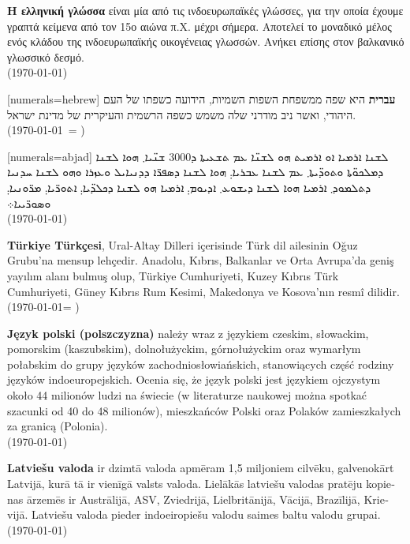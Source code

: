 \documentclass[a4paper]{article}
\begin{document}
\begin{greek}
\textbf{Η ελληνική γλώσσα} είναι μία από τις ινδοευρωπαϊκές γλώσσες, για την
οποία έχουμε γραπτά κείμενα από τον 15ο αιώνα π.Χ. μέχρι σήμερα. Αποτελεί το
μοναδικό μέλος ενός κλάδου της ινδοευρωπαϊκής οικογένειας γλωσσών. Ανήκει
επίσης στον βαλκανικό γλωσσικό δεσμό.\\	
(\today) 
\end{greek}


\begin{hebrew}[numerals=hebrew]
\textbf{עברית} היא שפה ממשפחת השפות השמיות, הידועה כשפתו של העם היהודי, ואשר ניב מודרני שלה משמש כשפה הרשמית והעיקרית של מדינת ישראל. \\
(\today\ = \hebrewtoday)
\end{hebrew}

\begin{syriac}[numerals=abjad]
ܠܫܢܐ ܐܪܡܝܐ ܐܘ ܐܪܡܝܬ ܗܘ ܠܫܢ̈ܐ ܥܡ ܬܫܥܝܬܐ ܕ\textrm{3000} ܫܢ̈ܝܐ܂ ܗܘܐ ܠܫܢܐ ܕܡܠܟܘ̈ܬܐ ܘܬܘܕ̈ܝܬܐ܂ ܥܡ ܠܫܢܐ ܥܒܪܝܐ܄ ܗܘܐ ܠܫܢܐ ܕܣܦܪ̈ܐ ܕܕܢܝܐܝܠ ܘܥܙܪܐ ܘܗܘ ܠܫܢܐ ܚܕܢܝܐ ܕܬܠܡܘܕ܂ ܐܪܡܝܐ ܗܘܐ ܠܫܢܐ ܕܝܫܘܥ܂ ܐܕܝܘܡ܄ ܐܪܡܝܐ ܗܘ ܠܫܢܐ ܕܟܠܕ̈ܝܐ܄ ܐܬܘܪ̈ܝܐ܄ ܡܪ̈ܘܢܝܐ܄ ܘܣܘܪ̈ܝܝܐ܀ \\
(\today)
\end{syriac}

\begin{turkish}
\textbf{Türkiye Türkçesi}, Ural-Altay Dilleri içerisinde Türk dil ailesinin Oğuz Grubu'na mensup lehçedir. Anadolu, Kıbrıs, Balkanlar ve Orta Avrupa'da geniş yayılım alanı bulmuş olup, Türkiye Cumhuriyeti, Kuzey Kıbrıs Türk Cumhuriyeti, Güney Kıbrıs Rum Kesimi, Makedonya ve Kosova'nın resmî dilidir. \\
(\today = \Hijritoday)
\end{turkish}

\begin{polish}
\textbf{Język polski (polszczyzna)} należy wraz z językiem czeskim, słowackim, pomorskim (kaszubskim), dolnołużyckim, górnołużyckim oraz wymarłym połabskim do grupy języków zachodniosłowiańskich, stanowiących część rodziny języków indoeuropejskich. Ocenia się, że język polski jest językiem ojczystym około 44 milionów ludzi na świecie (w literaturze naukowej można spotkać szacunki od 40 do 48 milionów), mieszkańców Polski oraz Polaków zamieszkałych za granicą (Polonia).\\
(\today)
\end{polish}

\begin{latvian} 
\textbf{Latviešu valoda} ir dzimtā valoda apmēram 1,5 miljoniem cilvēku, galvenokārt Latvijā, kurā tā ir vienīgā valsts valoda. Lielākās latviešu valodas pratēju kopienas ārzemēs ir Austrālijā, ASV, Zviedrijā, Lielbritānijā, Vācijā, Brazīlijā, Krievijā. Latviešu valoda pieder indoeiropiešu valodu saimes baltu valodu grupai.\\
(\today)
\end{latvian}
\end{document}
